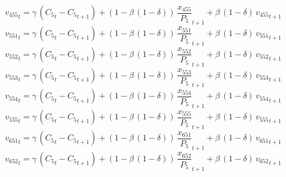 \begin{dmath}
{{v_{455}}}_{t}={{\gamma}}\, \left({{C_{5}}}_{t}-{{C_{5}}}_{t+1}\right)+\left(1-{{\beta}}\, \left(1-{{\delta}}\right)\right)\, {{\frac{x_{455}}{P_{5}}}}_{t+1}+{{\beta}}\, \left(1-{{\delta}}\right)\, {{v_{455}}}_{t+1}
\end{dmath}
\begin{dmath}
{{v_{551}}}_{t}={{\gamma}}\, \left({{C_{5}}}_{t}-{{C_{5}}}_{t+1}\right)+\left(1-{{\beta}}\, \left(1-{{\delta}}\right)\right)\, {{\frac{x_{551}}{P_{5}}}}_{t+1}+{{\beta}}\, \left(1-{{\delta}}\right)\, {{v_{551}}}_{t+1}
\end{dmath}
\begin{dmath}
{{v_{552}}}_{t}={{\gamma}}\, \left({{C_{5}}}_{t}-{{C_{5}}}_{t+1}\right)+\left(1-{{\beta}}\, \left(1-{{\delta}}\right)\right)\, {{\frac{x_{552}}{P_{5}}}}_{t+1}+{{\beta}}\, \left(1-{{\delta}}\right)\, {{v_{552}}}_{t+1}
\end{dmath}
\begin{dmath}
{{v_{553}}}_{t}={{\gamma}}\, \left({{C_{5}}}_{t}-{{C_{5}}}_{t+1}\right)+\left(1-{{\beta}}\, \left(1-{{\delta}}\right)\right)\, {{\frac{x_{553}}{P_{5}}}}_{t+1}+{{\beta}}\, \left(1-{{\delta}}\right)\, {{v_{553}}}_{t+1}
\end{dmath}
\begin{dmath}
{{v_{554}}}_{t}={{\gamma}}\, \left({{C_{5}}}_{t}-{{C_{5}}}_{t+1}\right)+\left(1-{{\beta}}\, \left(1-{{\delta}}\right)\right)\, {{\frac{x_{554}}{P_{5}}}}_{t+1}+{{\beta}}\, \left(1-{{\delta}}\right)\, {{v_{554}}}_{t+1}
\end{dmath}
\begin{dmath}
{{v_{555}}}_{t}={{\gamma}}\, \left({{C_{5}}}_{t}-{{C_{5}}}_{t+1}\right)+\left(1-{{\beta}}\, \left(1-{{\delta}}\right)\right)\, {{\frac{x_{555}}{P_{5}}}}_{t+1}+{{\beta}}\, \left(1-{{\delta}}\right)\, {{v_{555}}}_{t+1}
\end{dmath}
\begin{dmath}
{{v_{651}}}_{t}={{\gamma}}\, \left({{C_{5}}}_{t}-{{C_{5}}}_{t+1}\right)+\left(1-{{\beta}}\, \left(1-{{\delta}}\right)\right)\, {{\frac{x_{651}}{P_{5}}}}_{t+1}+{{\beta}}\, \left(1-{{\delta}}\right)\, {{v_{651}}}_{t+1}
\end{dmath}
\begin{dmath}
{{v_{652}}}_{t}={{\gamma}}\, \left({{C_{5}}}_{t}-{{C_{5}}}_{t+1}\right)+\left(1-{{\beta}}\, \left(1-{{\delta}}\right)\right)\, {{\frac{x_{652}}{P_{5}}}}_{t+1}+{{\beta}}\, \left(1-{{\delta}}\right)\, {{v_{652}}}_{t+1}
\end{dmath}

